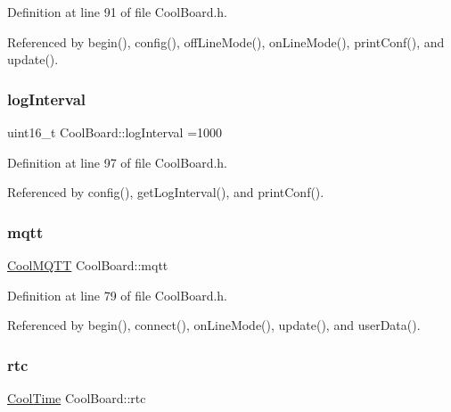 Definition at line 91 of file Cool\+Board.\+h.



Referenced by begin(), config(), off\+Line\+Mode(), on\+Line\+Mode(), print\+Conf(), and update().

\mbox{\label{classCoolBoard_a4de0096d575d66b472c4c1f0111fd452}} 
\subsubsection{\texorpdfstring{log\+Interval}{logInterval}}
{\footnotesize\ttfamily uint16\+\_\+t Cool\+Board\+::log\+Interval =1000\hspace{0.3cm}{\ttfamily [private]}}



Definition at line 97 of file Cool\+Board.\+h.



Referenced by config(), get\+Log\+Interval(), and print\+Conf().

\mbox{\label{classCoolBoard_a2399f44d7c23c1149a335cb3b46d90f1}} 
\subsubsection{\texorpdfstring{mqtt}{mqtt}}
{\footnotesize\ttfamily \hyperlink{classCoolMQTT}{Cool\+M\+Q\+TT} Cool\+Board\+::mqtt\hspace{0.3cm}{\ttfamily [private]}}



Definition at line 79 of file Cool\+Board.\+h.



Referenced by begin(), connect(), on\+Line\+Mode(), update(), and user\+Data().

\mbox{\label{classCoolBoard_a50d2a6716879d64a85f3c6b44ad63275}} 
\subsubsection{\texorpdfstring{rtc}{rtc}}
{\footnotesize\ttfamily \hyperlink{classCoolTime}{Cool\+Time} Cool\+Board\+::rtc\hspace{0.3cm}{\ttfamily [private]}}




